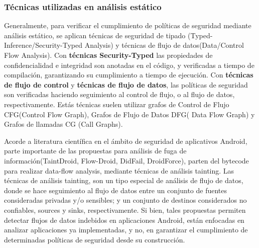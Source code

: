 \subsubsection{Técnicas utilizadas en análisis estático } 
Generalmente, para verificar el cumplimiento de políticas de seguridad mediante
análisis estático, se aplican técnicas de seguridad de tipado
(Typed-Inference/Security-Typed Analysis) y técnicas de flujo de
datos(Data/Control Flow Analysis)\cite{Information-Flow-Java}.\newline 
Con \textbf{técnicas Security-Typed} las propiedades de confidencialidad e
integridad son anotadas en el código, y verificadas a tiempo de compilación,
garantizando su cumplimiento a tiempo de ejecución.\newline 
Con \textbf{técnicas de flujo de control} y \textbf{técnicas de flujo de datos},
las políticas de seguridad son verificadas haciendo seguimiento al control de
flujo, o al flujo de datos, respectivamente. Estás técnicas suelen utilizar
grafos de Control de Flujo CFG(Control Flow Graph), Grafos de Flujo de Datos
DFG( Data Flow Graph) y Grafos de llamadas CG (Call Graphs).

Acorde a literatura científica en el ámbito de seguridad de aplicativos
Android, parte importante de las propuestas para análisis de fuga de
información(TaintDroid\cite{TaintDroid}, Flow-Droid\cite{FlowDroid-Thesis},
DidFail\cite{DidFail}, DroidForce\cite{DroidForce}), parten del bytecode para
realizar data-flow analysis, mediante técnicas de análisis tainting. Las
técnicas de análisis tainting, son un tipo especial de análisis de flujo de
datos, donde se hace seguimiento al flujo de datos entre un conjunto de fuentes
consideradas privadas y/o sensibles; y un conjunto de destinos considerados no
confiables, sources y sinks, respectivamente.\newline 
Si bien, tales propuestas permiten detectar flujos de datos indebidos en
aplicaciones Android, están enfocadas en analizar aplicaciones ya implementadas,
y no, en garantizar el cumplimiento de determinadas políticas de seguridad desde
su construcción.
% 

